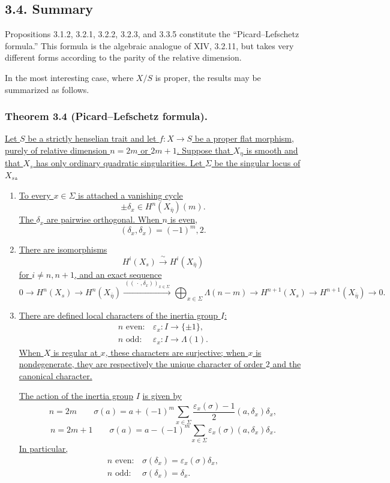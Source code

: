 \subsection*{3.4. Summary}

Propositions 3.1.2, 3.2.1, 3.2.2, 3.2.3, and 3.3.5 constitute
the ``Picard--Lefschetz formula.''  This formula is the algebraic
analogue of XIV, 3.2.11, but takes very different forms according to
the parity of the relative dimension.

In the most interesting case, where $X/S$ is proper, the results may
be summarized as follows.

\subsubsection*{Theorem 3.4 (Picard--Lefschetz formula).}
\underline{Let $S$ be a strictly henselian trait and let
$f:X\to S$ be a proper flat morphism, purely of relative dimension
$n=2m$ or $2m+1$.  Suppose that $X_\eta$ is smooth and that $X_s$
has only ordinary quadratic singularities.  Let $\Sigma$ be the
singular locus of $X_s$.}

\begin{enumerate}
\item[(i)] \underline{To every $x\in\Sigma$ is attached a vanishing
cycle}
\[
\pm\delta_x\in H^n(X_{\bar\eta})(m).
\]
\underline{The $\delta_x$ are pairwise orthogonal.  When $n$ is even,}
\[
(\delta_x,\delta_x)=(-1)^m,2.
\]

\item[(ii)] \underline{There are isomorphisms}
\[
H^i(X_s)\xrightarrow{\ \sim\ }H^i(X_{\bar\eta})
\]
\underline{for $i\ne n,n+1$, and an exact sequence}
\[
0\longrightarrow H^n(X_s)
 \longrightarrow H^n(X_{\bar\eta})
 \xrightarrow{\,((\,\cdot\,,\delta_x))_{x\in\Sigma}\,}
 \bigoplus_{x\in\Sigma}\Lambda(n-m)
 \longrightarrow H^{n+1}(X_s)
 \longrightarrow H^{n+1}(X_{\bar\eta})
 \longrightarrow0.
\]

\item[(iii)] \underline{There are defined local characters of the
inertia group $I$:}
\[
\begin{array}{lll}
n\text{ even}:&\varepsilon_x:I\longrightarrow\{\pm1\},\\[2pt]
n\text{ odd}:&\varepsilon_x:I\longrightarrow\Lambda(1).
\end{array}
\]
\underline{When $X$ is regular at $x$, these characters are
surjective; when $x$ is nondegenerate, they are respectively the
unique character of order $2$ and the canonical character.}

\underline{The action of the inertia group} $I$ \underline{is given by}
\[
n=2m\qquad
\sigma(a)=a+(-1)^m\sum_{x\in\Sigma}
 \frac{\varepsilon_x(\sigma)-1}{2}
 (a,\delta_x)\delta_x,
\]
\[
n=2m+1\qquad
\sigma(a)=a-(-1)^m\sum_{x\in\Sigma}
 \varepsilon_x(\sigma)(a,\delta_x)\delta_x.
\]
\underline{In particular,}
\[
\begin{array}{lll}
n\text{ even}:&\sigma(\delta_x)=\varepsilon_x(\sigma)\delta_x,\\[2pt]
n\text{ odd}:&\sigma(\delta_x)=\delta_x.
\end{array}
\]
\end{enumerate}

